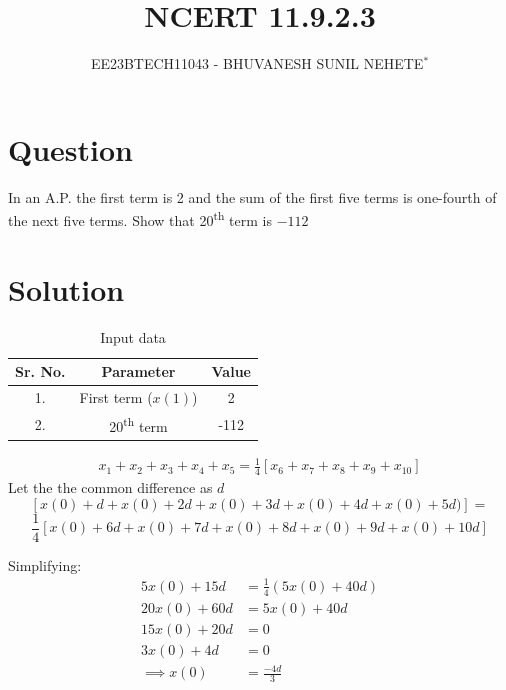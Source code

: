 \documentclass[journal,12pt,twocolumn]{IEEEtran}
\theoremstyle{remark}
\begin{document}

\vspace{3cm}

\title{NCERT 11.9.2.3}
\author{EE23BTECH11043 - BHUVANESH SUNIL NEHETE$^{*}$%
}
\maketitle
\newpage
\bigskip

\renewcommand{\thefigure}{\theenumi}
\renewcommand{\thetable}{\theenumi}



\section*{Question}

In an A.P. the first term is 2 and the sum of the first five terms is one-fourth of the next five terms. Show that 20\textsuperscript{th} term is $-112$

\section*{Solution}
\begin{table}[h]
    \centering
    \begin{tabular}{|c|c|c|}
        \hline
        \textbf{Sr. No.} & \textbf{Parameter} & \textbf{Value} \\
        \hline
        1. & First term (\(x(1)\)) & 2 \\
        \hline
        2. & 20\textsuperscript{th} term & -112\\
        \hline
    \end{tabular}
    \caption{Input data}
  \label{input data}
\end{table}

   \begin{align}
        x_1 + x_2 + x_3 + x_4 + x_5 = \frac{1}{4} [x_6 + x_7 + x_8 + x_9 + x_{10}]
    \end{align}
Let the the common difference as \(d\)
\[[x(0) + d + x(0) + 2d + x(0) + 3d + x(0) + 4d + x(0) + 5d)] =\]
\[\frac{1}{4} [x(0) + 6d + x(0) + 7d + x(0) + 8d + x(0) + 9d + x(0) + 10d]\]

Simplifying:
    \begin{align}
        5x(0) + 15d &= \frac{1}{4}(5x(0) + 40d)\\
        20x(0) + 60d &= 5x(0) + 40d\\
        15x(0) + 20d &= 0\\
        3x(0) + 4d &= 0\\ 
        \implies x(0) &= \frac{-4d}{3}
    \end{align}
\end{document}

